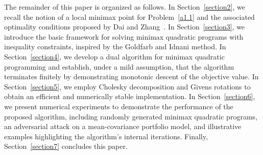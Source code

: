 \documentclass{article}
\begin{document}
	The remainder of this paper is organized as follows.
	In Section~\ref{section2}, we recall the notion of a local minimax point for Problem~\eqref{a1.1} and the associated optimality conditions proposed by Dai and Zhang~\cite{daiOptimalityConditionsConstrained2020}.
	In Section~\ref{section3}, we introduce the basic framework for solving minimax quadratic programs with inequality constraints, inspired by the Goldfarb and Idnani method.
	In Section~\ref{section4}, we develop a dual algorithm for minimax quadratic programming and establish, under a mild assumption, that the algorithm terminates finitely by demonstrating monotonic descent of the objective value.
	In Section~\ref{section5}, we employ Cholesky decomposition and Givens rotations to obtain an efficient and numerically stable implementation.
	In Section~\ref{section6}, we present numerical experiments to demonstrate the performance of the proposed algorithm, including randomly generated minimax quadratic programs, an adversarial attack on a mean-covariance portfolio model, and illustrative examples highlighting the algorithm's internal iterations.
	Finally, Section~\ref{section7} concludes this paper.
	
\end{document}
